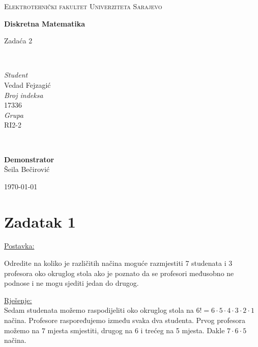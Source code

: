 \documentclass[12pt]{article}
\begin{document}
\begin{titlepage}
	\newcommand{\HRule}{\rule{\linewidth}{0.5mm}}
	
	\center
	
	\textsc{\Large Elektrotehnički fakultet Univerziteta Sarajevo}\\[4cm]
	
	{\huge\bfseries Diskretna Matematika\vspace{5mm}

 	Zadaća 2}\\[4.5cm]

	\begin{minipage}{0.4\textwidth}
		\begin{flushleft}
			\large
			\textit{Student}\\
			Vedad Fejzagić\\[5mm]
			\textit{Broj indeksa}\\
			17336\\[5mm]
			\textit{Grupa}\\
			RI2-2
		\end{flushleft}
	\end{minipage}
	~
	\begin{minipage}{0.4\textwidth}
		\begin{flushright}
			\large
			\textbf{Demonstrator}\\
			\hspace{10mm}Šeila Bečirović
		\end{flushright}
	\end{minipage}
	
	\vfill\vfill\vfill
	
	{\large\today}
	
	\vfill
	
\end{titlepage}


\newpage

\section*{Zadatak 1\label{Z1}}

\underline{Postavka:}

Odredite na koliko je različitih načina moguće razmjestiti 7 studenata i 3 profesora oko okruglog stola ako je poznato da se profesori međusobno ne podnose i ne mogu sjediti jedan do drugog.

\underline{Rješenje:}\\

Sedam studenata možemo raspodijeliti oko okruglog stola na $6! = 6  \cdot 5 \cdot 4 \cdot 3 \cdot 2 \cdot 1$ načina. Profesore raspoređujemo između svaka dva studenta. Prvog profesora možemo na $7$ mjesta smjestiti, drugog na 6 i trećeg na 5 mjesta. Dakle $7 \cdot 6 \cdot 5$ načina.
\end{document}
